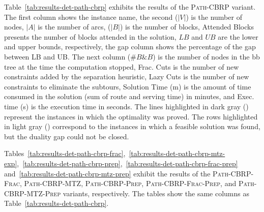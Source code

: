 Table~\ref{tab:results-det-path-cbrp} exhibits the results of the \textsc{Path-CBRP} variant. The first column shows the instance name, the second ($|V|$) is the number of nodes, $|A|$ is the number of arcs, ($|B|$) is the number of blocks, Attended Blocks presents the number of blocks attended in the solution, $LB$ and $UB$ are the lower and upper bounds, respectively, the gap column shows the percentage of the gap between LB and UB. The next column ($\#B\&B$) is the number of nodes in the \gls{bb} tree at the time the computation stopped, Frac. Cuts is the number of new constraints added by the separation heuristic, Lazy Cuts is the number of new constraints to eliminate the subtours, Solution Time (m) is the amount of time consumed in the solution (sum of route and serving time) in minutes, and Exec. time (s) is the execution time in seconds. The lines highlighted in dark gray (\crule[rowgrey]{3mm}{3mm}) represent the instances in which the optimality was proved. The rows highlighted in light gray (\crule[rowlight]{3mm}{3mm}) correspond to the instances in which a feasible solution was found, but the duality gap could not be closed.

Tables~\ref{tab:results-det-path-cbrp-frac},~\ref{tab:results-det-path-cbrp-mtz-exp},~\ref{tab:results-det-path-cbrp-prep},~\ref{tab:results-det-path-cbrp-frac-prep} and~\ref{tab:results-det-path-cbrp-mtz-prep} exhibit the results of the \textsc{Path-CBRP-Frac}, \textsc{Path-CBRP-MTZ}, \textsc{Path-CBRP-Prep}, \textsc{Path-CBRP-Frac-Prep}, and \textsc{Path-CBRP-MTZ-Prep} variants, respectively. The tables show the same columns as Table~\ref{tab:results-det-path-cbrp}.

